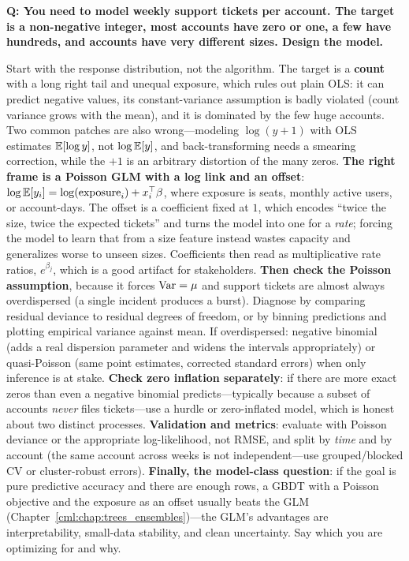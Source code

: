\begin{interviewq}
\textbf{Q: You need to model weekly support tickets per account. The target is a non-negative integer, most accounts have zero or one, a few have hundreds, and accounts have very different sizes. Design the model.}

 \quad {} \quad \badgefreq{\freqlow}

\stronganswer

Start with the response distribution, not the algorithm. The target is a \textbf{count} with a long right tail and unequal exposure, which rules out plain OLS: it can predict negative values, its constant-variance assumption is badly violated (count variance grows with the mean), and it is dominated by the few huge accounts. Two common patches are also wrong---modeling $\log(y+1)$ with OLS estimates $\operatorname{\mathbb{E}}[\log y]$, not $\log \operatorname{\mathbb{E}}[y]$, and back-transforming needs a smearing correction, while the $+1$ is an arbitrary distortion of the many zeros. \textbf{The right frame is a Poisson GLM with a log link and an offset}: $\log\operatorname{\mathbb{E}}[y_i] = \log(\text{exposure}_i) + x_i^{\top}\beta$, where exposure is seats, monthly active users, or account-days. The offset is a coefficient fixed at $1$, which encodes ``twice the size, twice the expected tickets'' and turns the model into one for a \emph{rate}; forcing the model to learn that from a size feature instead wastes capacity and generalizes worse to unseen sizes. Coefficients then read as multiplicative rate ratios, $e^{\beta_j}$, which is a good artifact for stakeholders. \textbf{Then check the Poisson assumption}, because it forces $\operatorname{Var}=\mu$ and support tickets are almost always overdispersed (a single incident produces a burst). Diagnose by comparing residual deviance to residual degrees of freedom, or by binning predictions and plotting empirical variance against mean. If overdispersed: negative binomial (adds a real dispersion parameter and widens the intervals appropriately) or quasi-Poisson (same point estimates, corrected standard errors) when only inference is at stake. \textbf{Check zero inflation separately}: if there are more exact zeros than even a negative binomial predicts---typically because a subset of accounts \emph{never} files tickets---use a hurdle or zero-inflated model, which is honest about two distinct processes. \textbf{Validation and metrics}: evaluate with Poisson deviance or the appropriate log-likelihood, not RMSE, and split by \emph{time} and by account (the same account across weeks is not independent---use grouped/blocked CV or cluster-robust errors). \textbf{Finally, the model-class question}: if the goal is pure predictive accuracy and there are enough rows, a GBDT with a Poisson objective and the exposure as an offset usually beats the GLM (Chapter~\ref{cml:chap:trees_ensembles})---the GLM's advantages are interpretability, small-data stability, and clean uncertainty. Say which you are optimizing for and why.


\end{interviewq}
